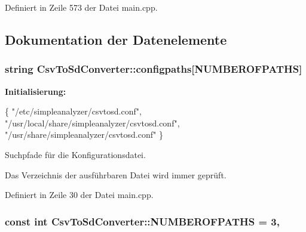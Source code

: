Definiert in Zeile 573 der Datei main.\-cpp.



\subsection{Dokumentation der Datenelemente}
\hypertarget{classCsvToSdConverter_a185377b44506f75748a4d56bc372ee50}{
\subsubsection[{configpaths}]{\setlength{\rightskip}{0pt plus 5cm}string Csv\-To\-Sd\-Converter\-::configpaths\mbox{[}{\bf N\-U\-M\-B\-E\-R\-O\-F\-P\-A\-T\-H\-S}\mbox{]}\hspace{0.3cm}{\ttfamily [protected]}}}\label{classCsvToSdConverter_a185377b44506f75748a4d56bc372ee50}
{\bfseries Initialisierung\-:}
\begin{DoxyCode}
\{
            \textcolor{stringliteral}{"/etc/simpleanalyzer/csvtosd.conf"},
            \textcolor{stringliteral}{"/usr/local/share/simpleanalyzer/csvtosd.conf"},
            \textcolor{stringliteral}{"/usr/share/simpleanalyzer/csvtosd.conf"} \}
\end{DoxyCode}


Suchpfade für die Konfigurationsdatei. 

Das Verzeichnis der ausführbaren Datei wird immer geprüft. 

Definiert in Zeile 30 der Datei main.\-cpp.

\hypertarget{classCsvToSdConverter_ad2278682506407d3172e8fca834891fe}{
\subsubsection[{N\-U\-M\-B\-E\-R\-O\-F\-P\-A\-T\-H\-S}]{\setlength{\rightskip}{0pt plus 5cm}const int Csv\-To\-Sd\-Converter\-::\-N\-U\-M\-B\-E\-R\-O\-F\-P\-A\-T\-H\-S = 3\hspace{0.3cm}{\ttfamily [static]}, {\ttfamily [protected]}}}\label{classCsvToSdConverter_ad2278682506407d3172e8fca834891fe}


